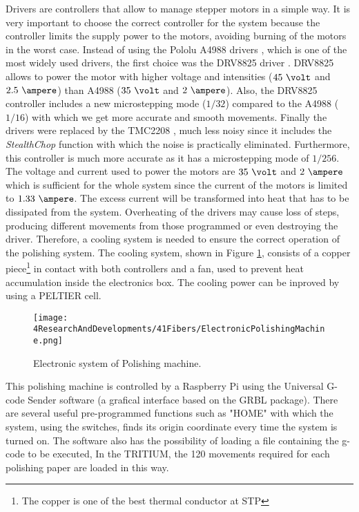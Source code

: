 \begin{enumerate}
Drivers are controllers that allow to manage stepper motors in a simple way. It is very important to choose the correct controller for the system because the controller limits the supply power to the motors, avoiding burning of the motors in the worst case. Instead of using the Pololu A4988 drivers \cite{A4988Driver}, which is one of the most widely used drivers, the first choice was the DRV8825 driver \cite{DRV8825Driver}. DRV8825 allows to power the motor with higher voltage and intensities ($45~\volt$ and $2.5~\ampere$) than A4988 ($35~\volt$ and $2~\ampere$). Also, the DRV8825 controller includes a new microstepping mode ($1/32$) compared to the A4988 ($1/16$) with which we get more accurate and smooth movements. Finally the drivers were replaced by the TMC2208 \cite{TMC2208Driver}, much less noisy since it includes the \textit{StealthChop} function with which the noise is practically eliminated. Furthermore, this controller is much more accurate as it has a microstepping mode of $1/256$. The voltage and current used to power the motors are $35~\volt$ and $2~\ampere$ which is sufficient for the whole system since the current of the motors is limited to $1.33~\ampere$. The excess current will be transformed into heat that has to be dissipated from the system. Overheating of the drivers may cause loss of steps, producing different movements from those programmed or even destroying the driver. Therefore, a cooling system is needed to ensure the correct operation of the polishing system. The cooling system, shown in Figure \ref{fig:ElectronicSystemPolishingMachine}, consists of a copper piece\footnote{The copper is one of the best thermal conductor at STP} in contact with both controllers and a fan, used to prevent heat accumulation inside the electronics box. The cooling power can be inproved by using a PELTIER cell.

\begin{figure}[h]
\centering
\texttt{[image: 4ResearchAndDevelopments/41Fibers/ElectronicPolishingMachine.png]}
\caption{Electronic system of Polishing machine.\label{fig:ElectronicSystemPolishingMachine}}
\end{figure}

\end{enumerate}

This polishing machine is controlled by a Raspberry Pi using the Universal G-code Sender software (a grafical interface based on the GRBL package). There are several useful pre-programmed functions such as "HOME" with which the system, using the switches, finds its origin coordinate every time the system is turned on. The software also has the possibility of loading a file containing the g-code to be executed, In the TRITIUM, the 120 movements required for each polishing paper are loaded in this way. 

